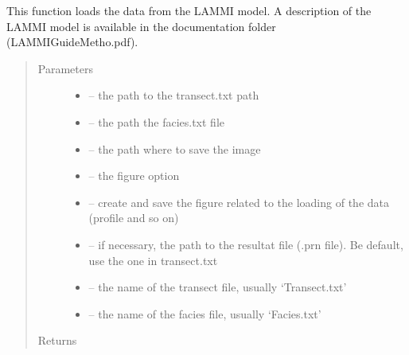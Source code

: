 \documentclass[letterpaper,10pt,english]{sphinxmanual}
\begin{document}
\begin{fulllineitems}
\label{\detokenize{index:src.lammi.load_lammi}}
This function loads the data from the LAMMI model. A description of the LAMMI model is available in the
documentation folder (LAMMIGuideMetho.pdf).
\begin{quote}\begin{description}
\item[{Parameters}] \leavevmode\begin{itemize}
\item {} 
 -- the path to the transect.txt path

\item {} 
 -- the path the facies.txt file

\item {} 
 -- the path where to save the image

\item {} 
 -- the figure option

\item {} 
 -- create and save the figure related to the loading of the data (profile and so on)

\item {} 
 -- if necessary, the path to the resultat file (.prn file). Be default, use the one in transect.txt

\item {} 
 -- the name of the transect file, usually `Transect.txt'

\item {} 
 -- the name of the facies file, usually `Facies.txt'

\end{itemize}

\item[{Returns}] \leavevmode


\end{description}\end{quote}



\end{fulllineitems}
\end{document}
